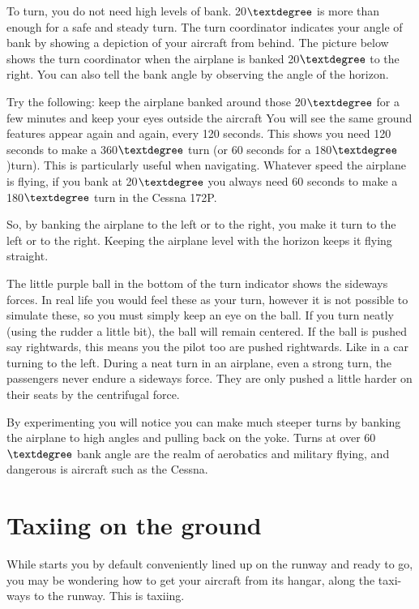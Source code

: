  To turn, you do not need high levels of bank. 
20$\textdegree$ is more than enough for a safe and steady turn. The turn
coordinator indicates your angle of bank by showing a depiction of your aircraft
from behind. The picture below shows the turn coordinator when the airplane is 
banked 20$\textdegree$ to the right. You can also tell the bank angle by 
observing the angle of the horizon.
   
Try the following: keep the airplane banked around those 20$\textdegree$ for a 
few minutes and keep your eyes outside the aircraft You will see the same 
ground features appear again and again, every 120 seconds. This shows you 
need 120 seconds to make a 360$\textdegree$ turn (or 60 seconds for a 
180$\textdegree$)turn). This is particularly useful when navigating.
Whatever speed the airplane is flying, if you bank at 20$\textdegree$ you 
always need 60 seconds to make a 180$\textdegree$ turn in the Cessna 172P.
      
So, by banking the airplane to the left or to the right, you make it turn to 
the left or to the right. Keeping the airplane level with the horizon keeps 
it flying straight.

The little purple ball in the bottom of the turn indicator 
shows the sideways forces. In real life you would feel these as your turn, 
however it is not possible to simulate these, so you must simply keep an eye
on the ball. If you turn neatly (using the rudder a little bit), 
the ball will remain centered. If the ball is pushed say rightwards, this 
means you the pilot too are pushed rightwards. Like in a car turning to the 
left. During a neat turn in an airplane, even a strong turn, the passengers 
never endure a sideways force. They are only pushed a little harder on their 
seats by the centrifugal force.

By experimenting you will notice you can make much steeper turns by
banking the airplane to high angles and pulling back on the yoke. Turns at over
60$\textdegree$ bank angle are the realm of aerobatics and military flying, and
dangerous is aircraft such as the Cessna. 
      
\section{Taxiing on the ground}
\label{sec:TaxiTurning}

While \FlightGear{} starts you by default conveniently lined up on the
runway and ready to go, you may be wondering how to get your aircraft from
its hangar, along the taxi-ways to the runway. This is taxiing.
    
